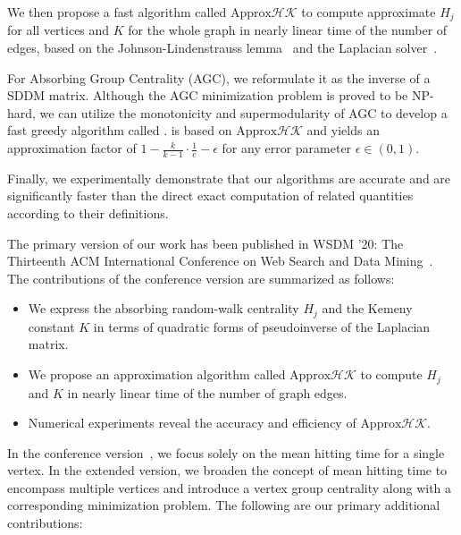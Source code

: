 \documentclass[10pt,twocolumn,twoside]{IEEEtran}
\begin{document}
We then propose a fast algorithm called \(\text{Approx}\mathcal{HK}\) to compute approximate \(H_j\) for all vertices and \(K\) for the whole graph in nearly linear time of the number of edges, based on the Johnson-Lindenstrauss lemma~\cite{Ac01} and the Laplacian solver~\cite{SpTe04,Sp10,KoMiPe11,LiBr12,CoKyMiPaPeRaSu14,KySa16,GaKySp23}.

For Absorbing Group Centrality (AGC), we reformulate it as the inverse of a SDDM matrix.
Although the AGC minimization problem is proved to be NP-hard, we can utilize the monotonicity and supermodularity of AGC to develop a fast greedy algorithm called .
 is based on \(\text{Approx}\mathcal{HK}\) and yields an approximation factor of \(1-\frac{k}{k-1}\cdot\frac{1}{e}-\epsilon\) for any error parameter \(\epsilon\in(0,1)\).

Finally, we experimentally demonstrate that our algorithms are accurate and are significantly faster than the direct exact computation of related quantities according to their definitions.

The primary version of our work has been published in WSDM '20: The Thirteenth ACM International Conference on Web Search and Data Mining~\cite{ZhXuZh20}. The contributions of the conference version are summarized as follows:

\begin{itemize}
    \item We express the absorbing random-walk centrality \(H_j\) and the Kemeny constant \(K\) in terms of quadratic forms of pseudoinverse of the Laplacian matrix.
    \item We propose an approximation algorithm called \(\text{Approx}\mathcal{HK}\) to compute \(H_j\) and \(K\) in nearly linear time of the number of graph edges.
    \item Numerical experiments reveal the accuracy and efficiency of \(\text{Approx}\mathcal{HK}\).
\end{itemize}

In the conference version~\cite{ZhXuZh20}, we focus solely on the mean hitting time for a single vertex.
In the extended version, we broaden the concept of mean hitting time to encompass multiple vertices and introduce a vertex group centrality along with a corresponding minimization problem.
The following are our primary additional contributions:
\end{document}
